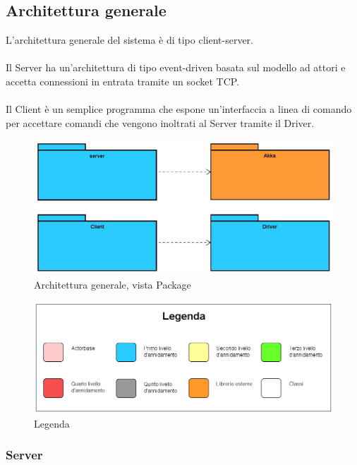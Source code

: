 \documentclass[a4paper]{article}
\begin{document}
		\subsection{Architettura generale}
        	L'architettura generale del sistema è di tipo client-server. \\ \\
            Il Server ha un'architettura di tipo event-driven basata sul modello ad attori e accetta connessioni in entrata tramite un socket TCP. \\ \\
			Il Client è un semplice programma che espone un'interfaccia a linea di comando per accettare comandi che vengono inoltrati al Server tramite 
			il Driver.
            
        \begin{figure} [H]
			\centering
			\includegraphics[width=\textwidth]{ST/generalLevel.jpg}
			\caption{Architettura generale, vista Package}
		\end{figure}
		
		\begin{figure} [H]
			\centering
			\includegraphics[scale=0.3]{ST/Legenda}
			\caption{Legenda}
		\end{figure}
		
        \subsubsection{Server}
		
\end{document}
